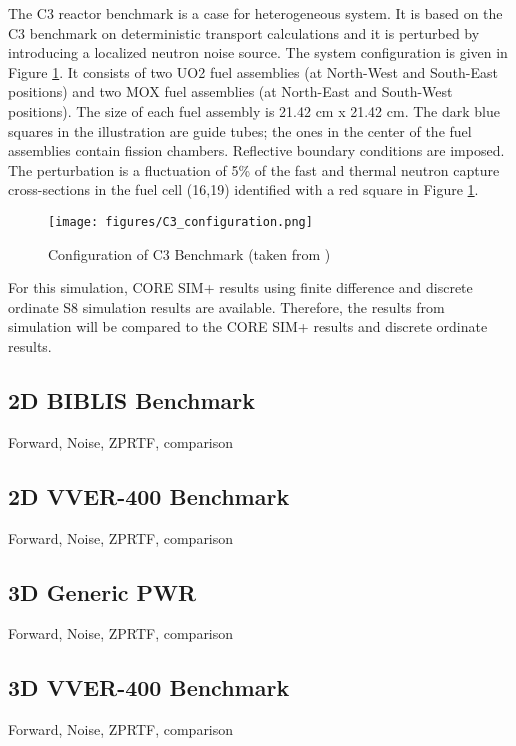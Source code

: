 The C3 reactor benchmark is a case for heterogeneous system. It is based on the C3 benchmark on deterministic transport calculations \cite{cavarecBenchmarkCalculationsPower1994} and it is perturbed by introducing a localized neutron noise source. The system configuration is given in Figure \ref{fig:C3_configuration}. It consists of two UO2 fuel assemblies (at North-West and South-East positions) and two MOX fuel assemblies (at North-East and South-West positions). The size of each fuel assembly is 21.42 cm x 21.42 cm. The dark blue squares in the illustration are guide tubes; the ones in the center of the fuel assemblies contain fission chambers. Reflective boundary conditions are imposed. The perturbation is a fluctuation of 5\% of the fast and thermal neutron capture cross-sections in the fuel cell (16,19) identified with a red square in Figure \ref{fig:C3_configuration}.
\begin{figure}[h]
        \centering
        \texttt{[image: figures/C3\_configuration.png]}
        \caption{Configuration of C3 Benchmark (taken from \cite{mylonakisNeutronNoiseSimulations2019})}
        \label{fig:C3_configuration}
\end{figure}

For this simulation, CORE SIM+ results using finite difference and discrete ordinate S8 simulation results are available. Therefore, the results from simulation will be compared to the CORE SIM+ results and discrete ordinate results.

\subsection{2D BIBLIS Benchmark}
Forward, Noise, ZPRTF, comparison

\subsection{2D VVER-400 Benchmark}
Forward, Noise, ZPRTF, comparison

\subsection{3D Generic PWR}
Forward, Noise, ZPRTF, comparison

\subsection{3D VVER-400 Benchmark}
Forward, Noise, ZPRTF, comparison

